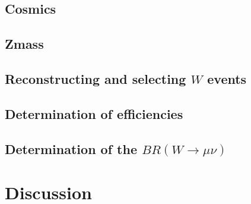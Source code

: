 \documentclass[twoside,        %
               BCOR12mm,       %
               ngerman,english, %
               fleqn,headsepline=false,footsepline=false
              ]{Vorlage/MFPREPORT}
\begin{document}
\subsection{Cosmics}
\subsection{Zmass}
\subsection{Reconstructing and selecting $W$ events}
\subsection{Determination of efficiencies}
\subsection{Determination of the $BR(W\rightarrow\mu\nu)$}
\section{Discussion}
\end{document}
